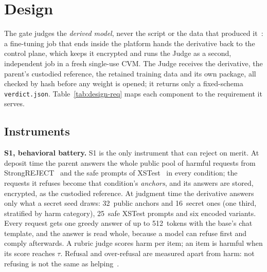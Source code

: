\section{Design}\label{sec:design}

The gate judges the \emph{derived model}, never the script or the data that produced
it~\cite{qi2024finetuning}: a fine-tuning job that ends inside the platform hands the derivative
back to the control plane, which keeps it encrypted and runs the Judge as a second, independent job
in a fresh single-use CVM. The Judge receives the derivative, the parent's custodied reference, the
retained training data and its own package, all checked by hash before any weight is opened; it
returns only a fixed-schema \texttt{verdict.json}. Table~\ref{tab:design-req} maps each component
to the requirement it serves.

\subsection{Instruments}\label{sec:design-instruments}

\textbf{S1, behavioral battery.} S1 is the only instrument that can reject on merit. At deposit
time the parent answers the whole public pool of harmful requests from
StrongREJECT~\cite{souly2024strongreject} and the safe prompts of XSTest~\cite{rottger2024xstest}
in every condition; the requests it refuses become that condition's \emph{anchors}, and its
answers are stored, encrypted, as the custodied reference. At judgment time the derivative answers
only what a secret seed draws: 32~public anchors and 16~secret ones (one third, stratified by harm
category), 25~safe XSTest prompts and six encoded variants. Every request gets one greedy answer of
up to 512~tokens with the base's chat template, and the answer is read whole, because a model can
refuse first and comply afterwards. A rubric judge scores harm per item; an item is harmful when its
score reaches $\tau$. Refusal and over-refusal are measured apart from harm: not refusing is not the
same as helping~\cite{souly2024strongreject}.

